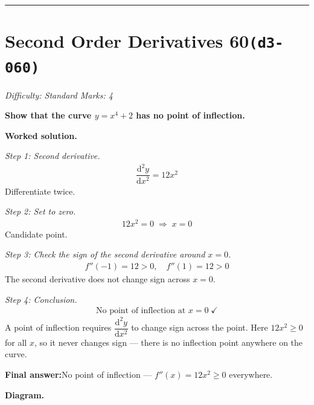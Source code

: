 \documentclass[11pt]{article}
\newcommand{\question}[1]{\par\medskip\noindent\textbf{#1}\par}
\begin{document}
\medskip\hrule

\section*{Second Order Derivatives 60\quad\small\texttt{(d3-060)}}
\textit{Difficulty: Standard \quad\textbar\quad Marks: 4}

\question{Show that the curve \( y = x^4 + 2 \) has no point of inflection.}

\textbf{Worked solution.}

\textit{Step 1: Second derivative.}
\[\begin{gathered}
\dfrac{\mathrm{d}^2y}{\mathrm{d}x^2} = 12x^2
\end{gathered}\]
Differentiate twice.

\textit{Step 2: Set to zero.}
\[\begin{gathered}
12x^2 = 0 \;\Rightarrow\; x = 0
\end{gathered}\]
Candidate point.

\textit{Step 3: Check the sign of the second derivative around \( x = 0 \).}
\[\begin{gathered}
f''(-1) = 12 > 0, \quad f''(1) = 12 > 0
\end{gathered}\]
The second derivative does not change sign across \( x = 0 \).

\textit{Step 4: Conclusion.}
\[\begin{gathered}
\text{No point of inflection at } x = 0 \;\checkmark
\end{gathered}\]
A point of inflection requires \( \dfrac{\mathrm{d}^2y}{\mathrm{d}x^2} \) to change sign across the point. Here \(12x^2 \geq 0\) for all \(x\), so it never changes sign --- there is no inflection point anywhere on the curve.

\begin{answerbox}
\textbf{Final answer:}\quad No point of inflection --- \(\displaystyle  f''(x) = 12x^2 \geq 0 \) everywhere.
\end{answerbox}
\textbf{Diagram.}
\end{document}
